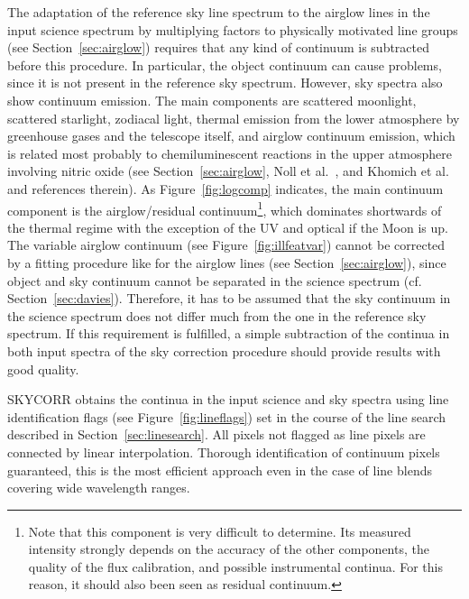 The adaptation of the reference sky line spectrum to the airglow lines in the
input science spectrum by multiplying factors to physically motivated line
groups (see Section~\ref{sec:airglow}) requires that any kind of continuum is
subtracted before this procedure. In particular, the object continuum can cause
problems, since it is not present in the reference sky spectrum. However, sky
spectra also show continuum emission. The main components are scattered
moonlight, scattered starlight, zodiacal light, thermal emission from the lower
atmosphere by greenhouse gases and the telescope itself, and airglow continuum
emission, which is related most probably to chemiluminescent reactions in the
upper atmosphere involving nitric oxide (see Section~\ref{sec:airglow}, Noll et
al.~\cite{NOL12}, and Khomich et al.~\cite{KHO08} and references therein). As
Figure~\ref{fig:logcomp} indicates, the main continuum component is the
airglow/residual continuum\footnote{Note that this component is very difficult
to determine. Its measured intensity strongly depends on the accuracy of the
other components, the quality of the flux calibration, and possible
instrumental continua. For this reason, it should also been seen as residual
continuum.}, which dominates shortwards of the thermal regime with the
exception of the UV and optical if the Moon is up. The variable airglow
continuum (see Figure~\ref{fig:illfeatvar}) cannot be corrected by a fitting
procedure like for the airglow lines (see Section~\ref{sec:airglow}), since
object and sky continuum cannot be separated in the science spectrum (cf.
Section~\ref{sec:davies}). Therefore, it has to be assumed that the sky
continuum in the science spectrum does not differ much from the one in the
reference sky spectrum. If this requirement is fulfilled, a simple subtraction
of the continua in both input spectra of the sky correction procedure should
provide results with good quality.

SKYCORR obtains the continua in the input science and sky spectra using line
identification flags (see Figure~\ref{fig:lineflags}) set in the course of the
line search described in Section~\ref{sec:linesearch}. All pixels not flagged
as line pixels are connected by linear interpolation. Thorough identification
of continuum pixels guaranteed, this is the most efficient approach even in the
case of line blends covering wide wavelength ranges.

